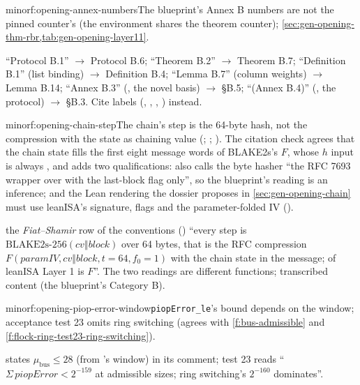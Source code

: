 \begin{finding}{minor}{f:opening-annex-numbers}{The blueprint's Annex B numbers are not the pinned counter's}
  (the environment  shares the theorem
counter); \cref{sec:gen-opening-thm-rbr,tab:gen-opening-layer11}.

 ``Protocol B.1'' $→$ Protocol B.6; ``Theorem B.2'' $→$ Theorem B.7;
``Definition B.1'' (list binding) $→$ Definition B.4; ``Lemma B.7'' (column weights) $→$ Lemma B.14;
``Annex B.3'' (, the novel basis) $→$ §B.5; ``(Annex B.4)'' (, the
protocol) $→$ §B.3. Cite labels (, , ,
) instead.
\end{finding}

\begin{finding}{minor}{f:opening-chain-step}{The chain's step is the 64-byte hash, not the compression with the state as chaining value}
  (;
; ). The citation check agrees
that the chain state fills the first eight message words of BLAKE2s's $F$, whose $h$ input is always
, and adds two qualifications:  also calls the byte hasher ``the RFC 7693
wrapper over  with the last-block flag only'', so the blueprint's reading is an
inference; and the Lean rendering the dossier proposes in \cref{sec:gen-opening-chain} must use
leanISA's signature,  flags and the parameter-folded IV
().

\begin{change}{the \emph{Fiat--Shamir} row of the conventions ()}
\asproposed ``every step is $\text{BLAKE2s-256}(\mathit{cv} ‖ \mathit{block})$ over 64 bytes, that
is the RFC compression $F(\mathit{paramIV}, \mathit{cv} ‖ \mathit{block}, t = 64, f_0 = 1)$ with the
chain state in the message;  of leanISA Layer 1 is $F$''.
\reason The two readings are different functions; transcribed content (the blueprint's
Category B).
\end{change}
\end{finding}

\begin{finding}{minor}{f:opening-piop-error-window}{\texttt{piopError\_le}'s bound depends on the window; acceptance test 23 omits ring switching}
  (agrees with \cref{f:bus-admissible} and
\cref{f:flock-ring-test23-ring-switching}).

  states $μ_{\mathrm{bus}} ≤ 28$ (from
's window) in its comment; test 23 reads ``$Σ\,\mathit{piopError} < 2^{-159}$ at
admissible sizes; ring switching's $2^{-160}$ dominates''.
\end{finding}

